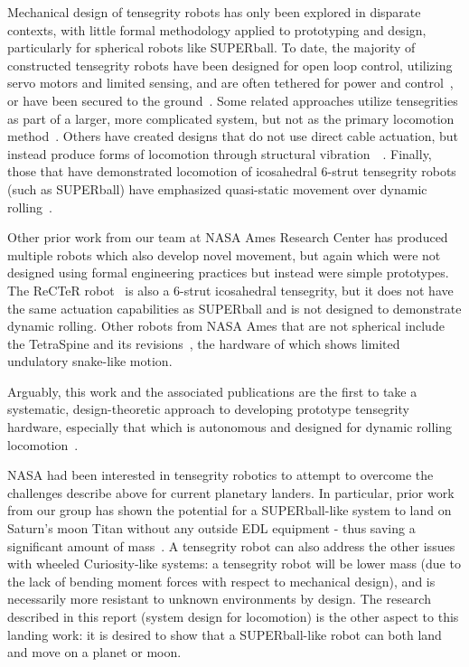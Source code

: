 \documentclass[12pt]{report}
\begin{document}
Mechanical design of tensegrity robots has only been explored in disparate contexts, with little formal methodology applied to prototyping and design, particularly for spherical robots like SUPERball.
To date, the majority of constructed tensegrity robots have been designed for open loop control, utilizing servo motors and limited sensing, and are often tethered for power and control~\cite{Koizumi2012b}, or have been secured to the ground~\cite{MiratsTur2010}.
Some related approaches utilize tensegrities as part of a larger, more complicated system, but not as the primary locomotion method~\cite{webster2013segmental}.
Others have created designs that do not use direct cable actuation, but instead produce forms of locomotion through structural vibration~\cite{khazanov2013exploiting}~\cite{bohm2013vibration}.
Finally, those that have demonstrated locomotion of icosahedral 6-strut tensegrity robots (such as SUPERball) have emphasized quasi-static movement over dynamic rolling~\cite{Shibata2009,Shibata2009a,Shibata2010}.

Other prior work from our team at NASA Ames Research Center has produced multiple robots which also develop novel movement, but again which were not designed using formal engineering practices but instead were simple prototypes.
The ReCTeR robot~\cite{Caluwaerts2013rsif,bruce2014design} is also a 6-strut icosahedral tensegrity, but it does not have the same actuation capabilities as SUPERball and is not designed to demonstrate dynamic rolling.
Other robots from NASA Ames that are not spherical include the TetraSpine and its revisions~\cite{Tietz2013,mirletz2014design}, the hardware of which shows limited undulatory snake-like motion.

Arguably, this work and the associated publications are the first to take a systematic, design-theoretic approach to developing prototype tensegrity hardware, especially that which is autonomous and designed for dynamic rolling locomotion~\cite{Caluwaerts2013rsif,sabelhaus2014hardware,bruce2014design,sabelhaus2015system}.

NASA had been interested in tensegrity robotics to attempt to overcome the challenges describe above for current planetary landers.
In particular, prior work from our group has shown the potential for a SUPERball-like system to land on Saturn's moon Titan without any outside EDL equipment - thus saving a significant amount of mass~\cite{Vytas_IPPW_2013,NIACfinalreport}.
A tensegrity robot can also address the other issues with wheeled Curiosity-like systems: a tensegrity robot will be lower mass (due to the lack of bending moment forces with respect to mechanical design), and is necessarily more resistant to unknown environments by design.
The research described in this report (system design for locomotion) is the other aspect to this landing work: it is desired to show that a SUPERball-like robot can both land and move on a planet or moon.
\end{document}
